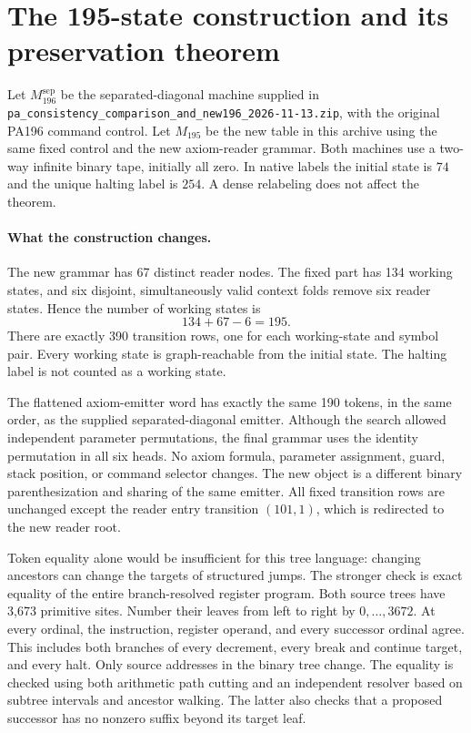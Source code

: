 \section{The 195-state construction and its preservation theorem}
\label{sec:preservation195}

Let $M_{196}^{\mathrm{sep}}$ be the separated-diagonal machine supplied in
\texttt{pa\_consistency\_comparison\_and\_new196\_2026-11-13.zip},
with the original PA196 command control. Let $M_{195}$ be the new table
in this archive using the same fixed control and the new axiom-reader
grammar. Both machines use a two-way infinite binary tape, initially all
zero. In native labels the initial state is $74$ and the unique halting
label is $254$. A dense relabeling does not affect the theorem.

\paragraph{What the construction changes.}
The new grammar has 67 distinct reader nodes. The fixed part has 134
working states, and six disjoint, simultaneously valid context folds
remove six reader states. Hence the number of working states is
\[
 134+67-6=195.
\]
There are exactly 390 transition rows, one for each working-state and
symbol pair. Every working state is graph-reachable from the initial
state. The halting label is not counted as a working state.

The flattened axiom-emitter word has exactly the same 190 tokens, in
the same order, as the supplied separated-diagonal emitter. Although the
search allowed independent parameter permutations, the final grammar
uses the identity permutation in all six heads. No axiom formula,
parameter assignment, guard, stack position, or command selector changes.
The new object is a different binary parenthesization and sharing of the
same emitter. All fixed transition rows are unchanged except the reader
entry transition $(101,1)$, which is redirected to the new reader root.

Token equality alone would be insufficient for this tree language:
changing ancestors can change the targets of structured jumps. The
stronger check is exact equality of the entire branch-resolved register
program. Both source trees have 3,673 primitive sites. Number their leaves
from left to right by $0,\ldots,3672$. At every ordinal, the instruction,
register operand, and every successor ordinal agree. This includes both
branches of every decrement, every break and continue target, and every
halt. Only source addresses in the binary tree change. The equality is
checked using both arithmetic path cutting and an independent resolver
based on subtree intervals and ancestor walking. The latter also checks
that a proposed successor has no nonzero suffix beyond its target leaf.

